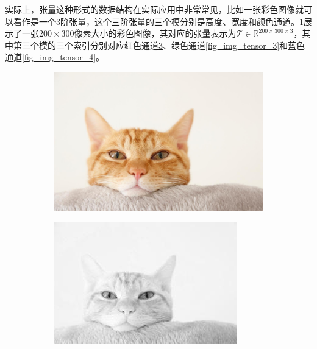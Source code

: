实际上，张量这种形式的数据结构在实际应用中非常常见，比如一张彩色图像就可以看作是一个3阶张量，这个三阶张量的三个模分别是高度、宽度和颜色通道。\cref{fig_img_tensor_1}展示了一张\( 200 \times 300 \)像素大小的彩色图像，其对应的张量表示为\( \mathcal{T} \in \mathbb{R}^{200 \times 300 \times 3} \)，其中第三个模的三个索引分别对应红色通道\cref{fig_img_tensor_2}、绿色通道\cref{fig_img_tensor_3}和蓝色通道\cref{fig_img_tensor_4}。

\begin{figure}[htb!]
    \centering
    \begin{subfigure}{.23\textwidth}
        \centering
        \includegraphics[width=.9\textwidth]{./img/matrix/cat.jpg}
        \caption{}
        \label{fig_img_tensor_1}
    \end{subfigure}
    \begin{subfigure}{.23\textwidth}
        \centering
        \includegraphics[width=.9\textwidth]{./img/matrix/cat_r.jpg}
        \caption{}
        \label{fig_img_tensor_2}
    \end{subfigure}

\end{figure}
